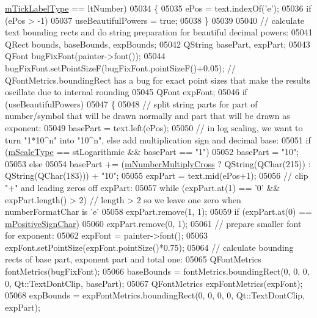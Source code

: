 \begin{DoxyCode}
      \hyperlink{a00025_a6e056c1cb1aab0eddebfebbcb78c8f90}{mTickLabelType} == ltNumber)
05034   \{
05035     ePos = text.indexOf(\textcolor{charliteral}{'e'});
05036     \textcolor{keywordflow}{if} (ePos > -1)
05037       useBeautifulPowers = \textcolor{keyword}{true};
05038   \}
05039   
05040   \textcolor{comment}{// calculate text bounding rects and do string preparation for beautiful decimal powers:}
05041   QRect bounds, baseBounds, expBounds;
05042   QString basePart, expPart;
05043   QFont bugFixFont(painter->font());
05044   bugFixFont.setPointSizeF(bugFixFont.pointSizeF()+0.05); \textcolor{comment}{// QFontMetrics.boundingRect has a bug for exact
       point sizes that make the results oscillate due to internal rounding }
05045   QFont expFont;
05046   \textcolor{keywordflow}{if} (useBeautifulPowers)
05047   \{
05048     \textcolor{comment}{// split string parts for part of number/symbol that will be drawn normally and part that will be drawn
       as exponent:}
05049     basePart = text.left(ePos);
05050     \textcolor{comment}{// in log scaling, we want to turn "1*10^n" into "10^n", else add multiplication sign and decimal base:}
05051     \textcolor{keywordflow}{if} (\hyperlink{a00025_ad706039549cbbbec5fcb2baf7894e04d}{mScaleType} == stLogarithmic && basePart == \textcolor{stringliteral}{"1"})
05052       basePart = \textcolor{stringliteral}{"10"};
05053     \textcolor{keywordflow}{else}
05054       basePart += (\hyperlink{a00025_aebf0367d8645d2e05b93a0952b7e805b}{mNumberMultiplyCross} ? QString(QChar(215)) : QString(QChar(183))) + \textcolor{stringliteral}{
      "10"};
05055     expPart = text.mid(ePos+1);
05056     \textcolor{comment}{// clip "+" and leading zeros off expPart:}
05057     \textcolor{keywordflow}{while} (expPart.at(1) == \textcolor{charliteral}{'0'} && expPart.length() > 2) \textcolor{comment}{// length > 2 so we leave one zero when
       numberFormatChar is 'e'}
05058       expPart.remove(1, 1);
05059     \textcolor{keywordflow}{if} (expPart.at(0) == \hyperlink{a00025_ae99d47103ec8ba66959205b23991241b}{mPositiveSignChar})
05060       expPart.remove(0, 1);
05061     \textcolor{comment}{// prepare smaller font for exponent:}
05062     expFont = painter->font();
05063     expFont.setPointSize(expFont.pointSize()*0.75);
05064     \textcolor{comment}{// calculate bounding rects of base part, exponent part and total one:}
05065     QFontMetrics fontMetrics(bugFixFont);
05066     baseBounds = fontMetrics.boundingRect(0, 0, 0, 0, Qt::TextDontClip, basePart);
05067     QFontMetrics expFontMetrics(expFont);
05068     expBounds = expFontMetrics.boundingRect(0, 0, 0, 0, Qt::TextDontClip, expPart);

\end{DoxyCode}

